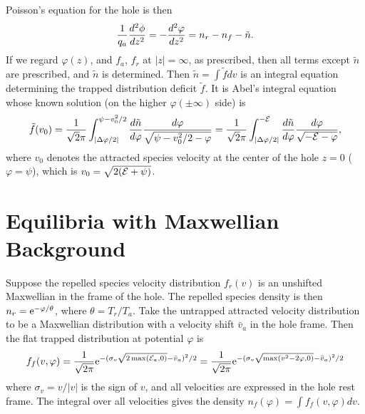 \documentclass[aip,pop,article-title]{revtex4-2}
\def\energy{{\cal E}}
\def\etothe#1{{\rm e}^{#1}}
\begin{document}
Poisson's equation for the hole is then
\begin{equation}
  \label{eq:Poisson}
  {1\over q_a}{d^2\phi\over dz^2}=-{d^2\varphi \over dz^2} = n_r-n_f-\tilde n.
\end{equation}
If we regard $\varphi(z)$, and $f_a$, $f_r$ at $|z|=\infty$, as prescribed,
then all terms except $\tilde n$ are prescribed, and $\tilde n$ is
determined. Then $\tilde n =\int \tilde f dv$ is an integral equation
determining the trapped distribution deficit $\tilde f$.  It is Abel's integral
equation whose known solution (on the higher $\varphi(\pm\infty)$ side) is
\begin{equation}
  \label{eq:abel}
  \tilde f(v_0) = {1\over \sqrt{2}\pi}\int_{|\Delta\varphi/2|}^{{\psi}-v_0^2/2}
    {d\tilde n\over d\varphi }{d\varphi \over
      \sqrt{{\psi}-v_0^2/2-\varphi } }
    ={1\over \sqrt{2}\pi}\int_{|\Delta\varphi/2|}^{-\energy}
    {d\tilde n\over d\varphi }{d\varphi \over
      \sqrt{-\energy-\varphi } },
\end{equation}
where $v_0$ denotes the attracted species velocity at the center of
the hole $z=0$ ($\varphi=\psi$), which is $v_0=\sqrt{2(\energy+{\psi})}$.


\section{Equilibria with Maxwellian Background}\label{sec2}

Suppose the repelled species velocity distribution $f_r(v)$ is an
unshifted Maxwellian in the frame of the hole. The repelled species density
is then $n_r=\etothe{-\varphi /\theta}$, where $\theta=T_r/T_a$.
Take the untrapped attracted velocity distribution to be a Maxwellian
distribution with a velocity shift $\bar v_a$ in the hole frame. Then the
flat trapped distribution at potential $\varphi$ is
\begin{equation}
  \label{eq:flattrap}
  f_f(v,\varphi)
  ={1\over \sqrt{2\pi}}\etothe
  {-(\sigma_v\sqrt{2\,{\rm max}(\energy_a,0)}-\bar v_a)^2/2}
  ={1\over \sqrt{2\pi}}\etothe
  {-(\sigma_v\sqrt{{\rm max}(v^2-2\varphi ,0)}-\bar v_a)^2/2}
\end{equation}
where $\sigma_v=v/|v|$ is the sign of $v$, and all velocities are
expressed in the hole rest frame. The integral over all velocities
gives the density $n_f(\varphi)=\int f_f(v,\varphi)dv$.
\end{document}
